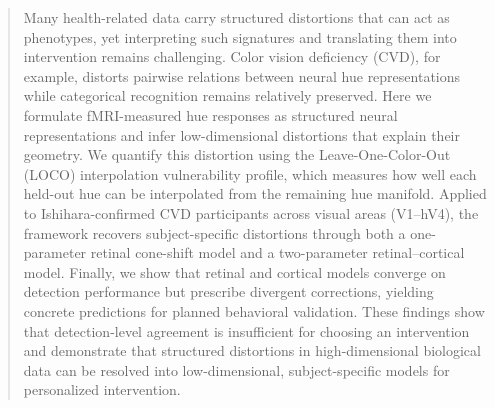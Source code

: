 \documentclass{article}
\begin{document}

\printAffiliationsAndNotice{}

\begin{abstract}
Many health-related data carry structured distortions that can act as phenotypes, yet interpreting such signatures and translating them into intervention remains challenging.
Color vision deficiency (CVD), for example, distorts pairwise relations between neural hue representations while categorical recognition remains relatively preserved.
Here we formulate fMRI-measured hue responses as structured neural representations and infer low-dimensional distortions that explain their geometry.
We quantify this distortion using the Leave-One-Color-Out (LOCO) interpolation vulnerability profile, which measures how well each held-out hue can be interpolated from the remaining hue manifold.
Applied to Ishihara-confirmed CVD participants across visual areas (V1--hV4), the framework recovers subject-specific distortions through both a one-parameter retinal cone-shift model and a two-parameter retinal–cortical model.
Finally, we show that retinal and cortical models converge on detection performance but prescribe divergent corrections, yielding concrete predictions for planned behavioral validation.
These findings show that detection-level agreement is insufficient for choosing an intervention and demonstrate that structured distortions in high-dimensional biological data can be resolved into low-dimensional, subject-specific models for personalized intervention.
\end{abstract}
\end{document}
